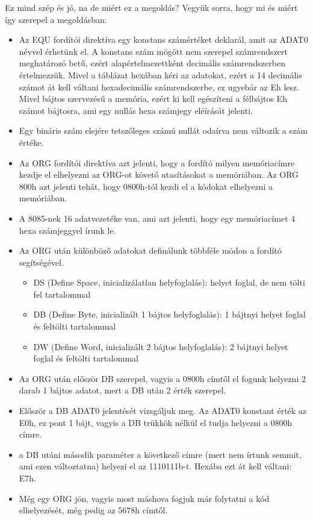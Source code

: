 \documentclass{article}
\begin{document}
Ez mind szép és jó, na de miért ez a megoldás? Vegyük sorra, hogy mi és miért így szerepel a megoldásban:
\begin{itemize}
	\item Az EQU fordítói direktíva egy konstans számértéket deklarál, amit az ADAT0 névvel érhetünk el. A konstans szám mögött nem szerepel számrendszert meghatározó betű, ezért alapértelmezettként decimális számrendszerben értelmezzük. Mivel a táblázat hexában kéri az adatokat, ezért a 14 decimális számot át kell váltani hexadecimális számrendszerbe, ez ugyebár az Eh lesz. Mivel bájtos szervezésű a memória, ezért ki kell egészíteni a félbájtos Eh számot bájtosra, ami egy nullás hexa számjegy eléírását jelenti.
	\item \colorbox{orange!30}{Egy bináris szám elejére tetszőleges számú nullát odaírva nem változik a szám értéke.}
	\item Az ORG fordítói direktíva azt jelenti, hogy a fordító milyen memóriacímre kezdje el elhelyezni az ORG-ot követő utasításokat a memóriában. Az ORG 800h azt jelenti tehát, hogy 0800h-tól kezdi el a kódokat elhelyezni a memóriában.
	\item \colorbox{orange!30}{A 8085-nek 16 adatvezetéke van, ami azt jelenti, hogy egy memóriacímet 4 hexa számjeggyel írunk le.}
	\item Az ORG után különböző adatokat definálunk többféle módon a fordító segítségével.
	\begin{itemize}
		\item DS (Define Space, inicializálatlan helyfoglalás): helyet foglal, de nem tölti fel tartalommal
		\item DB (Define Byte, inicializált 1 bájtos helyfoglalás): 1 bájtnyi helyet foglal és feltölti tartalommal
		\item DW (Define Word, inicializált 2 bájtos helyfoglalás): 2 bájtnyi helyet foglal és feltölti tartalommal
	\end{itemize}
	\item Az ORG után először DB szerepel, vagyis a 0800h címtől el fogunk helyezni 2 darab 1 bájtos adatot, mert a DB után 2 érték szerepel.
	\item Először a DB ADAT0 jelentését vizsgáljuk meg. Az ADAT0 konstant érték az E0h, ez pont 1 bájt, vagyis a DB trükkök nélkül el tudja helyezni a 0800h címre.
	\item a DB utáni második paraméter a következő címre (mert nem írtunk semmit, ami ezen változtatna) helyezi el az 1110111b-t. Hexába ezt át kell váltani: E7h.
	\item Még egy ORG jön, vagyis most máshova fogjuk már folytatni a kód elhelyezését, még pedig az 5678h címtől.

\end{itemize}
\end{document}
